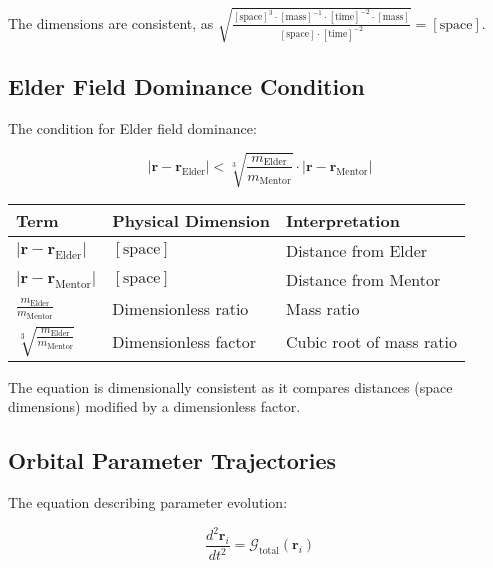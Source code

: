 The dimensions are consistent, as $\sqrt{\frac{[\text{space}]^3 \cdot [\text{mass}]^{-1} \cdot [\text{time}]^{-2} \cdot [\text{mass}]}{[\text{space}] \cdot [\text{time}]^{-2}}} = [\text{space}]$.

\subsection{Elder Field Dominance Condition}

The condition for Elder field dominance:

\begin{equation}
|\mathbf{r} - \mathbf{r}_{\text{Elder}}| < \sqrt[3]{\frac{m_{\text{Elder}}}{m_{\text{Mentor}}}} \cdot |\mathbf{r} - \mathbf{r}_{\text{Mentor}}|
\end{equation}

\begin{center}
\label{tab:dimensional_analysis_elder_dominance}
\begin{tabular}{p{4cm} p{4cm} p{6cm}}
\textbf{Term} & \textbf{Physical Dimension} & \textbf{Interpretation} \\
\hline
$|\mathbf{r} - \mathbf{r}_{\text{Elder}}|$ & $[\text{space}]$ & Distance from Elder \\
$|\mathbf{r} - \mathbf{r}_{\text{Mentor}}|$ & $[\text{space}]$ & Distance from Mentor \\
$\frac{m_{\text{Elder}}}{m_{\text{Mentor}}}$ & Dimensionless ratio & Mass ratio \\
$\sqrt[3]{\frac{m_{\text{Elder}}}{m_{\text{Mentor}}}}$ & Dimensionless factor & Cubic root of mass ratio \\
\hline
\end{tabular}
\end{center}

The equation is dimensionally consistent as it compares distances (space dimensions) modified by a dimensionless factor.

\subsection{Orbital Parameter Trajectories}

The equation describing parameter evolution:

\begin{equation}
\frac{d^2\mathbf{r}_i}{dt^2} = \mathcal{G}_{\text{total}}(\mathbf{r}_i)
\end{equation}


